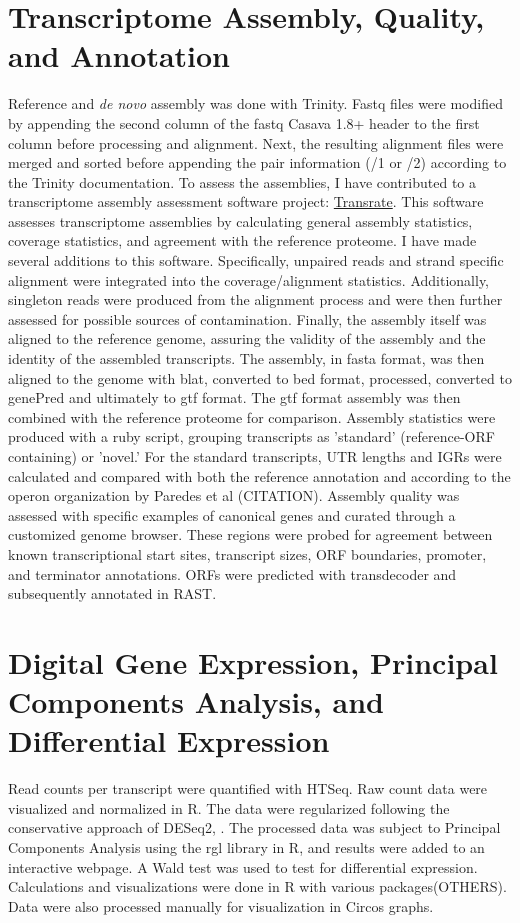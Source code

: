 \section{Transcriptome Assembly, Quality, and Annotation}
Reference and \textit{de novo} assembly was done with Trinity\cite{58}. Fastq files were modified by appending the second column of the fastq Casava 1.8+ header to the first column before processing and alignment. Next, the resulting alignment files were merged and sorted before appending the pair information (/1 or /2) according to the Trinity documentation. 
To assess the assemblies, I have contributed to a transcriptome assembly assessment software project: \href{https://github.com/MatthewRalston/transrate}{Transrate}. This software assesses transcriptome assemblies by calculating general assembly statistics, coverage statistics, and agreement with the reference proteome. I have made several additions to this software. Specifically, unpaired reads and strand specific alignment were integrated into the coverage/alignment statistics. Additionally, singleton reads were produced from the alignment process and were then further assessed for possible sources of contamination. Finally, the assembly itself was aligned to the reference genome, assuring the validity of the assembly and the identity of the assembled transcripts. The assembly, in fasta format, was then aligned to the genome with blat, converted to bed format, processed, converted to genePred and ultimately to gtf format. The gtf format assembly was then combined with the reference proteome for comparison.
Assembly statistics were produced with a ruby script, grouping transcripts as 'standard' (reference-ORF containing) or 'novel.' For the standard transcripts, UTR lengths and IGRs were calculated and compared with both the reference annotation and according to the operon organization by Paredes et al (CITATION).
Assembly quality was assessed with specific examples of canonical genes and curated through a customized genome browser. These regions were probed for agreement between known transcriptional start sites, transcript sizes, ORF boundaries, promoter, and terminator annotations.
ORFs were predicted with transdecoder and subsequently annotated in RAST.


\section{Digital Gene Expression, Principal Components Analysis, and Differential Expression}
Read counts per transcript were quantified with HTSeq\cite{48}. Raw count data were visualized and normalized in R. The data were regularized following the conservative approach of DESeq2\cite{52}, \cite{53}. The processed data was subject to Principal Components Analysis using the rgl library in R, and results were added to an interactive webpage. A Wald test was used to test for differential expression. Calculations and visualizations were done in R with various packages(OTHERS)\cite{55}. Data were also processed manually for visualization in Circos graphs\cite{50}.

